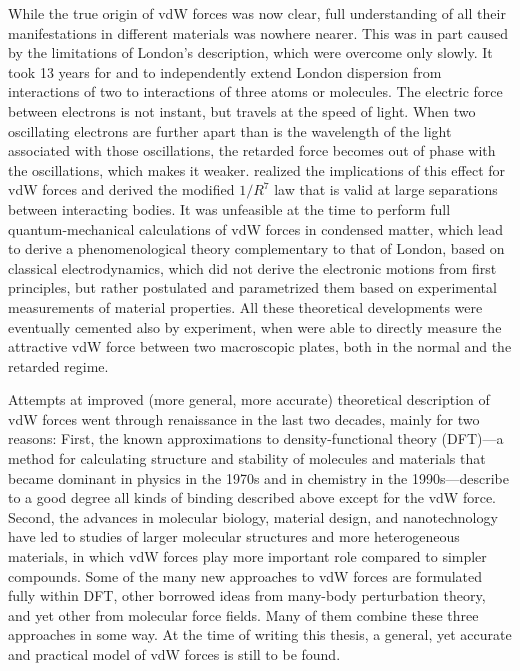 While the true origin of vdW forces was now clear, full understanding of all their manifestations in different materials was nowhere nearer.
This was in part caused by the limitations of London's description, which were overcome only slowly.
It took 13 years for \citet{AxilrodJCP43} and \citet{MutoNS43} to independently extend London dispersion from interactions of two to interactions of three atoms or molecules.
The electric force between electrons is not instant, but travels at the speed of light.
When two oscillating electrons are further apart than is the wavelength of the light associated with those oscillations, the retarded force becomes out of phase with the oscillations, which makes it weaker.
\citet{CasimirPR48} realized the implications of this effect for vdW forces and derived the modified $1/R^7$ law that is valid at large separations between interacting bodies.
It was unfeasible at the time to perform full quantum-mechanical calculations of vdW forces in condensed matter, which lead \citet{LifshitzSPJ56} to derive a phenomenological theory complementary to that of London, based on classical electrodynamics, which did not derive the electronic motions from first principles, but rather postulated and parametrized them based on experimental measurements of material properties.
All these theoretical developments were eventually cemented also by experiment, when \citet{TaborPRSLA69} were able to directly measure the attractive vdW force between two macroscopic plates, both in the normal and the retarded regime.

Attempts at improved (more general, more accurate) theoretical description of vdW forces went through renaissance in the last two decades, mainly for two reasons:
First, the known approximations to density-functional theory (DFT)---a method for calculating structure and stability of molecules and materials that became dominant in physics in the 1970s and in chemistry in the 1990s---describe to a good degree all kinds of binding described above except for the vdW force.
Second, the advances in molecular biology, material design, and nanotechnology have led to studies of larger molecular structures and more heterogeneous materials, in which vdW forces play more important role compared to simpler compounds.
Some of the many new approaches to vdW forces are formulated fully within DFT, other borrowed ideas from many-body perturbation theory, and yet other from molecular force fields.
Many of them combine these three approaches in some way.
At the time of writing this thesis, a general, yet accurate and practical model of vdW forces is still to be found.

